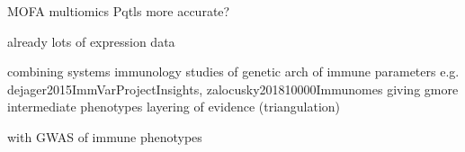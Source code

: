 \begin{outline}
    MOFA
    multiomics
        Pqtls more accurate?

    already lots of expression data

    combining systems immunology studies of genetic arch of immune parameters
            e.g. dejager2015ImmVarProjectInsights, zalocusky201810000Immunomes
        giving gmore intermediate phenotypes
        layering of evidence (triangulation)

    with GWAS of immune phenotypes

\end{outline}

